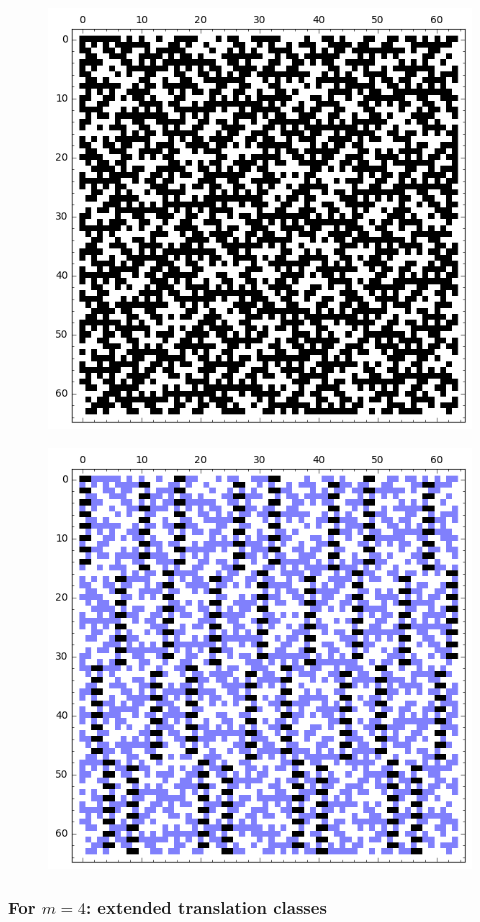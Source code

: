 \documentclass[pdf,sprung,slideColor,nocolorBG]{beamer}
\newenvironment{colortheme}[1]{
\def\ProvidesPackageRCS $##1${\relax}
\renewcommand{\ProcessOptions}{\relax}
\makeatletter

\makeatother
}{}
\begin{document}
\begin{colortheme}{jubata}
\begin{frame}
\begin{figure}
\begin{minipage}{.48\textwidth}
  \includegraphics[width=.9\linewidth]{../matrix_plot/re6_4_weight_class_matrix.png}
  \label{fig:6_4_weight_class_matrix}
\end{minipage}%
\begin{minipage}{.48\textwidth}
  \centering
  \includegraphics[width=.9\linewidth]{../matrix_plot/re6_4_bent_cayley_graph_index_matrix.png}
  \label{fig:6_4_bent_cayley_graph_index_matrix}
\end{minipage}
\end{figure}
\end{frame}
\begin{frame}
\frametitle{For $m=4$: extended translation classes}


\end{frame}
\end{colortheme}
\end{document}
